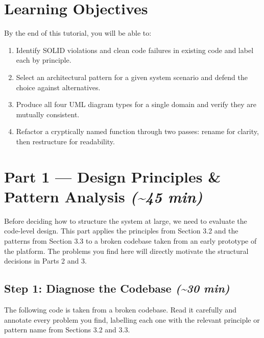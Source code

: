 \documentclass[11pt,a4paper]{book}
\begin{document}
\medskip

\section{Learning Objectives}

By the end of this tutorial, you will be able to:

\begin{enumerate}
  \item Identify SOLID violations and clean code failures in existing code and label each by principle.
  \item Select an architectural pattern for a given system scenario and defend the choice against alternatives.
  \item Produce all four UML diagram types for a single domain and verify they are mutually consistent.
  \item Refactor a cryptically named function through two passes: rename for clarity, then restructure for readability.
\end{enumerate}

\medskip

\section{Part 1 --- Design Principles \& Pattern Analysis \textit{(\textasciitilde{}45 min)}}

Before deciding how to structure the system at large, we need to evaluate the code-level design. This part applies the principles from Section 3.2 and the patterns from Section 3.3 to a broken codebase taken from an early prototype of the platform. The problems you find here will directly motivate the structural decisions in Parts 2 and 3.

\subsection{Step 1: Diagnose the Codebase \textit{(\textasciitilde{}30 min)}}

The following code is taken from a broken codebase. Read it carefully and annotate every problem you find, labelling each one with the relevant principle or pattern name from Sections 3.2 and 3.3.
\end{document}
